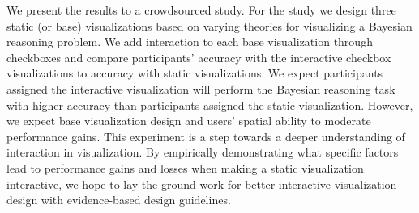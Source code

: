 We present the results to a crowdsourced study. For the study we design three static (or base) visualizations based on varying theories for visualizing a Bayesian reasoning problem. We add interaction to each base visualization through checkboxes and compare participants' accuracy with the interactive checkbox visualizations to accuracy with static visualizations. We expect participants assigned the interactive visualization will perform the Bayesian reasoning task with higher accuracy than participants assigned the static visualization. However, we expect base visualization design and users' spatial ability to moderate performance gains.  
This experiment is a step towards a deeper understanding of interaction in visualization. By empirically demonstrating what specific factors lead to performance gains and losses when making a static visualization interactive, we hope to lay the ground work for better interactive visualization design with evidence-based design guidelines. 

